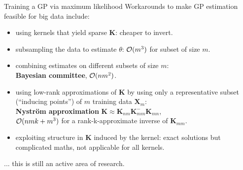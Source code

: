 \begin{vbframe}{Training a GP via maximum likelihood}
Workarounds to make GP estimation feasible for big data include:
\begin{itemize}
\item using kernels that yield sparse $\bm K$: cheaper to invert.
\item subsampling the data to estimate $\theta$: $\mathcal{O}(m^3)$ for subset of size $m$.
\item combining estimates on different subsets of size $m$:\\ \textbf{Bayesian committee}, $\mathcal{O}(n m^2)$.
\item using low-rank approximations of $\bm{K}$ by using only a representative subset (\enquote{inducing points}) of $m$ training data $\bm X_m$:\\ \textbf{Nyström approximation} $\bm K \approx \bm K_{nm} \bm K_{mm}^{-} \bm K_{mn}$,\\ $\mathcal{O}(nmk + m^3)$ for a rank-k-approximate inverse of $\bm K_{mm}$.
\item exploiting structure in $\bm{K}$ induced by the kernel: exact solutions but complicated maths, not  applicable for all kernels.
\end{itemize}

... this is still an active area of research.

\end{vbframe}

% 
% 
% 
% 
% 
% 

\endlecture
